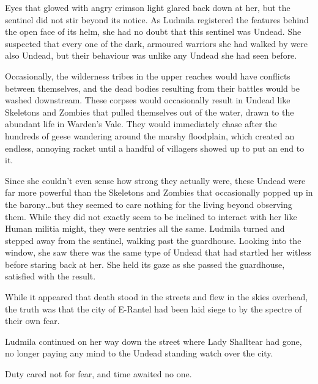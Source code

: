  

Eyes that glowed with angry crimson light glared back down at her, but the sentinel did not stir beyond its notice. As Ludmila registered the features behind the open face of its helm, she had no doubt that this sentinel was Undead. She suspected that every one of the dark, armoured warriors she had walked by were also Undead, but their behaviour was unlike any Undead she had seen before.

 

Occasionally, the wilderness tribes in the upper reaches would have conflicts between themselves, and the dead bodies resulting from their battles would be washed downstream. These corpses would occasionally result in Undead like Skeletons and Zombies that pulled themselves out of the water, drawn to the abundant life in Warden’s Vale. They would immediately chase after the hundreds of geese wandering around the marshy floodplain, which created an endless, annoying racket until a handful of villagers showed up to put an end to it.

 

Since she couldn’t even sense how strong they actually were, these Undead were far more powerful than the Skeletons and Zombies that occasionally popped up in the barony…but they seemed to care nothing for the living beyond observing them. While they did not exactly seem to be inclined to interact with her like Human militia might, they were sentries all the same. Ludmila turned and stepped away from the sentinel, walking past the guardhouse. Looking into the window, she saw there was the same type of Undead that had startled her witless before staring back at her. She held its gaze as she passed the guardhouse, satisfied with the result.

 

While it appeared that death stood in the streets and flew in the skies overhead, the truth was that the city of E-Rantel had been laid siege to by the spectre of their own fear.

 

Ludmila continued on her way down the street where Lady Shalltear had gone, no longer paying any mind to the Undead standing watch over the city.

 

Duty cared not for fear, and time awaited no one.